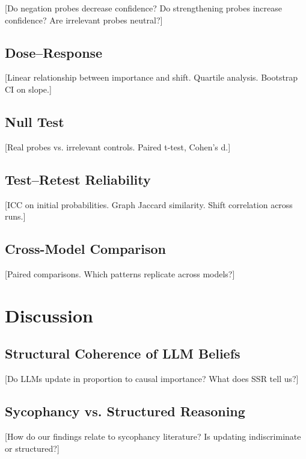 \documentclass[11pt]{article}
\begin{document}
[Do negation probes decrease confidence? Do strengthening probes increase confidence? Are irrelevant probes neutral?]

\subsection{Dose--Response}

[Linear relationship between importance and shift. Quartile analysis. Bootstrap CI on slope.]

\subsection{Null Test}

[Real probes vs. irrelevant controls. Paired t-test, Cohen's d.]

\subsection{Test--Retest Reliability}

[ICC on initial probabilities. Graph Jaccard similarity. Shift correlation across runs.]

\subsection{Cross-Model Comparison}

[Paired comparisons. Which patterns replicate across models?]

\section{Discussion}
\label{sec:discussion}


\subsection{Structural Coherence of LLM Beliefs}

[Do LLMs update in proportion to causal importance? What does SSR tell us?]

\subsection{Sycophancy vs. Structured Reasoning}

[How do our findings relate to sycophancy literature? Is updating indiscriminate or structured?]
\end{document}
